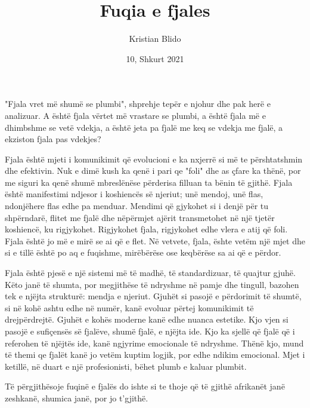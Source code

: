 \documentclass{article}[a4]
\begin{document}
\title{Fuqia e fjales}
\date{10, Shkurt 2021}
\author{Kristian Blido}
\maketitle

"Fjala vret më shumë se plumbi", shprehje tepër e njohur dhe pak herë e analizuar. A është fjala vërtet më vrastare se plumbi, a është fjala më e dhimbshme se vetë vdekja, a është jeta pa fjalë me keq se vdekja me fjalë, a ekziston fjala pas vdekjes?

Fjala është mjeti i komunikimit që evolucioni e ka nxjerrë si më te përshtatshmin dhe efektivin. Nuk e dimë kush ka qenë i pari qe "foli" dhe as çfare ka thënë, por me siguri ka qenë shumë mbreslënëse përderisa filluan ta bënin të gjithë. Fjala është manifestimi ndjesor i koshiencës së njeriut; unë mendoj, unë flas, ndonjëhere flas edhe pa menduar. Mendimi që gjykohet si i denjë për tu shpërndarë, flitet me fjalë dhe nëpërmjet ajërit transmetohet në një tjetër koshiencë, ku rigjykohet. Rigjykohet fjala, rigjykohet edhe vlera e atij që foli. Fjala është jo më e mirë se ai që e flet. Në vetvete, fjala, ështe vetëm një mjet dhe si e tillë është po aq e fuqishme, mirëbërëse ose keqbërëse sa ai që e përdor.

Fjala është pjesë e një sistemi më të madhë, të standardizuar, të quajtur gjuhë. Këto janë të shumta, por megjithëse të ndryshme në pamje dhe tingull, bazohen tek e njëjta strukturë: mendja e njeriut. Gjuhët si pasojë e përdorimit të shumtë, si në kohë ashtu edhe në numër, kanë evoluar përtej komunikimit të drejpërdrejtë. Gjuhët e kohës moderne kanë edhe nuanca estetike. Kjo vjen si pasojë e sufiçensës së fjalëve, shumë fjalë, e njëjta ide. Kjo ka sjellë që fjalë që i referohen të njëjtës ide, kanë ngjyrime emocionale të ndryshme. Thënë kjo, mund të themi qe fjalët kanë jo vetëm kuptim logjik, por edhe ndikim emocional. Mjet i ketillë, në duart e një profesionisti, bëhet plumb e kaluar plumbit.

Të përgjithësoje fuqinë e fjalës do ishte si te thoje që të gjithë afrikanët janë zeshkanë, shumica janë, por jo t'gjithë.
\end{document}
